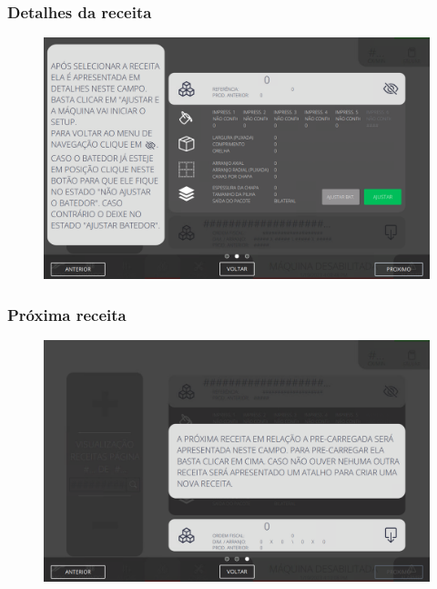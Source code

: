 \newpage
\thispagestyle{fancy}
\vspace*{40 pt}
\subsubsection{\small{Detalhes da receita}} \label{sec:telaCarregandoPedidoDetalhesReceita}
\vspace*{\fill}
\begin{figure}[h]
    \centering
    \includegraphics[width=576 px,height=360 px]{src/imagesICV/09-request/visualization/e-5.png}
\end{figure}
\vspace*{\fill}

\newpage
\thispagestyle{fancy}
\vspace*{40 pt}
\subsubsection{\small{Próxima receita}} \label{sec:telaCarregandoPedidoProximaReceita}
\vspace*{\fill}
\begin{figure}[h]
    \centering
    \includegraphics[width=576 px,height=360 px]{src/imagesICV/09-request/visualization/e-6.png}
\end{figure}
\vspace*{\fill}
